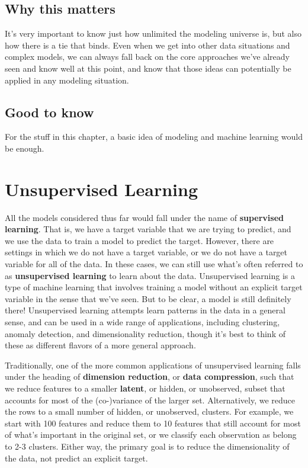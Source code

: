 \documentclass[
  letterpaper,
]{krantz}
\begin{document}
\subsection{Why this matters}\label{why-this-matters-2}

It's very important to know just how unlimited the modeling universe is,
but also how there is a tie that binds. Even when we get into other data
situations and complex models, we can always fall back on the core
approaches we've already seen and know well at this point, and know that
those ideas can potentially be applied in any modeling situation.

\subsection{Good to know}\label{good-to-know-2}

For the stuff in this chapter, a basic idea of modeling and machine
learning would be enough.

\section{Unsupervised Learning}\label{sec-ml-more-unsuper}

All the models considered thus far would fall under the name of
\textbf{supervised learning}. That is, we have a target variable that we
are trying to predict, and we use the data to train a model to predict
the target. However, there are settings in which we do not have a target
variable, or we do not have a target variable for all of the data. In
these cases, we can still use what's often referred to as
\textbf{unsupervised learning} to learn about the data. Unsupervised
learning is a type of machine learning that involves training a model
without an explicit target variable in the sense that we've seen. But to
be clear, a model is still definitely there! Unsupervised learning
attempts learn patterns in the data in a general sense, and can be used
in a wide range of applications, including clustering, anomaly
detection, and dimensionality reduction, though it's best to think of
these as different flavors of a more general approach.

Traditionally, one of the more common applications of unsupervised
learning falls under the heading of \textbf{dimension reduction}, or
\textbf{data compression}, such that we reduce features to a smaller
\textbf{latent}, or hidden, or unobserved, subset that accounts for most
of the (co-)variance of the larger set. Alternatively, we reduce the
rows to a small number of hidden, or unobserved, clusters. For example,
we start with 100 features and reduce them to 10 features that still
account for most of what's important in the original set, or we classify
each observation as belong to 2-3 clusters. Either way, the primary goal
is to reduce the dimensionality of the data, not predict an explicit
target.
\end{document}

